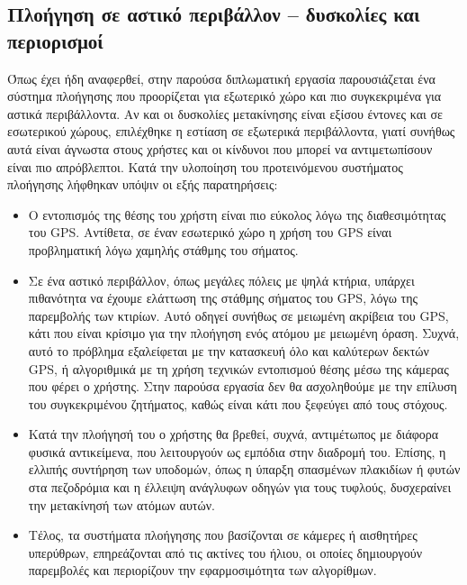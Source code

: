 \subsection{Πλοήγηση σε αστικό περιβάλλον – δυσκολίες και περιορισμοί}
Όπως έχει ήδη αναφερθεί, στην παρούσα διπλωματική εργασία παρουσιάζεται ένα σύστημα πλοήγησης που προορίζεται για εξωτερικό χώρο και πιο συγκεκριμένα για αστικά περιβάλλοντα. Αν και οι δυσκολίες μετακίνησης είναι εξίσου έντονες και σε εσωτερικού χώρους, επιλέχθηκε η εστίαση σε εξωτερικά περιβάλλοντα, γιατί συνήθως αυτά είναι άγνωστα στους χρήστες και οι κίνδυνοι που μπορεί να αντιμετωπίσουν είναι πιο απρόβλεπτοι. Κατά την υλοποίηση του προτεινόμενου συστήματος πλοήγησης λήφθηκαν υπόψιν οι εξής παρατηρήσεις:
\begin{itemize}
    \item Ο εντοπισμός της θέσης του χρήστη είναι πιο εύκολος λόγω της διαθεσιμότητας του GPS. Αντίθετα, σε έναν εσωτερικό χώρο η χρήση του GPS είναι προβληματική λόγω χαμηλής στάθμης του σήματος.
    \item Σε ένα αστικό περιβάλλον, όπως μεγάλες πόλεις με ψηλά κτήρια, υπάρχει πιθανότητα να έχουμε ελάττωση της στάθμης σήματος του GPS, λόγω της παρεμβολής των κτιρίων. Αυτό οδηγεί συνήθως σε μειωμένη ακρίβεια του GPS, κάτι που είναι κρίσιμο για την πλοήγηση ενός ατόμου με μειωμένη όραση. Συχνά, αυτό το πρόβλημα εξαλείφεται με την κατασκευή όλο και καλύτερων δεκτών GPS, ή αλγοριθμικά με τη χρήση τεχνικών εντοπισμού θέσης μέσω της κάμερας που φέρει ο χρήστης. Στην παρούσα εργασία δεν θα ασχοληθούμε με την επίλυση του συγκεκριμένου ζητήματος, καθώς είναι κάτι που ξεφεύγει από τους στόχους.
    \item Κατά την πλοήγησή του ο χρήστης θα βρεθεί, συχνά, αντιμέτωπος με διάφορα φυσικά αντικείμενα, που λειτουργούν ως εμπόδια στην διαδρομή του. Επίσης, η ελλιπής συντήρηση των υποδομών, όπως η ύπαρξη σπασμένων πλακιδίων ή φυτών στα πεζοδρόμια και η έλλειψη ανάγλυφων οδηγών για τους τυφλούς, δυσχεραίνει την μετακίνησή των ατόμων αυτών.
    \item Τέλος, τα συστήματα πλοήγησης που βασίζονται σε κάμερες ή αισθητήρες υπερύθρων, επηρεάζονται από τις ακτίνες του ήλιου, οι οποίες δημιουργούν παρεμβολές και περιορίζουν την εφαρμοσιμότητα των αλγορίθμων.
\end{itemize}

